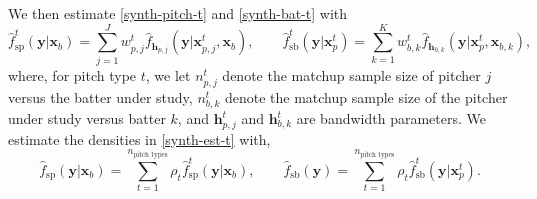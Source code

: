 \documentclass[12pt]{article}
\newcommand{\y}{\textbf{y}}
\newcommand{\x}{\textbf{x}}
\newcommand{\h}{\textbf{h}}
\begin{document}
We then estimate \eqref{synth-pitch-t} and \eqref{synth-bat-t} with
\begin{equation} \label{synth-est-t}
  \hat f_{\text{sp}}^t(\y|\x_b) = \sum_{j=1}^J w_{p,j}^t\hat f_{\h_{p,j}}(\y|\x_{p,j}^t,\x_b), 
  \qquad
  \hat f_{\text{sb}}^t(\y|\x_p^t) = \sum_{k=1}^K w_{b,k}^t\hat f_{\h_{b,k}}(\y|\x_p^t,\x_{b,k}),
\end{equation}
where, for pitch type $t$, we let $n_{p,j}^t$ denote the matchup sample size of pitcher $j$ versus the batter under study, $n_{b,k}^t$ denote the matchup sample size of the pitcher under study versus batter $k$, and $\h_{p,j}^t$ and $\h_{b,k}^t$ are bandwidth parameters. We estimate the densities in \eqref{synth-est-t} with,
\begin{equation} \label{synth-est}
  \hat f_{\text{sp}}(\y|\x_b) =  \sum_{t=1}^{n_{\text{pitch types}}} \rho_t \hat f_{\text{sp}}^t(\y|\x_b),
  \qquad
  \hat f_{\text{sb}}(\y) = \sum_{t=1}^{n_{\text{pitch types}}} \rho_t 
    \hat f_{\text{sb}}^t(\y|\x_p^t).
\end{equation}
\end{document}
